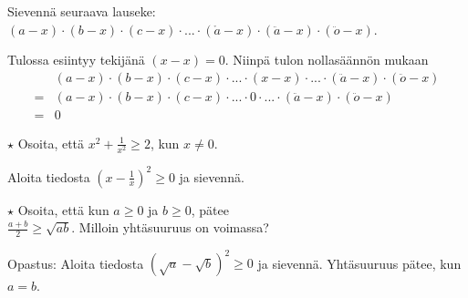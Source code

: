 \begin{tehtavasivu}
\begin{tehtava}
    Sievennä seuraava lauseke: $(a-x)\cdot(b-x)\cdot(c-x)\cdot...\cdot(\mathring{a}-x)\cdot(\ddot{a}-x)\cdot(\ddot{o}-x)$.
    \begin{vastaus}
        Tulossa esiintyy tekijänä $(x-x)=0$. Niinpä tulon nollasäännön mukaan
        \begin{align*}
            &(a-x)\cdot(b-x)\cdot(c-x)\cdot...\cdot(x-x)\cdot...\cdot(\ddot{a}-x)\cdot(\ddot{o}-x) \\
            =&(a-x)\cdot(b-x)\cdot(c-x)\cdot...\cdot 0\cdot...\cdot(\ddot{a}-x)\cdot(\ddot{o}-x) \\
            =&0
        \end{align*}
    \end{vastaus}
\end{tehtava}



\begin{tehtava} %
$\star$ Osoita, että $x^2+\frac{1}{x^2}\geq 2$, kun $x \neq 0$.
    \begin{vastaus}
     Aloita tiedosta $\left(x-\frac{1}{x}\right)^2 \geq 0$ ja sievennä.
    \end{vastaus}
\end{tehtava}

\begin{tehtava} 
$\star$ Osoita, että kun $a \geq 0$ ja $b \geq 0$, pätee \\ $\frac{a+b}{2} \geq \sqrt{ab}$. Milloin yhtäsuuruus on voimassa?
    \begin{vastaus}
     Opastus: Aloita tiedosta $\left(\sqrt{a}-\sqrt{b}\right)^2 \geq 0$ ja sievennä. Yhtäsuuruus pätee, kun $a = b$.
    \end{vastaus}
\end{tehtava}

\end{tehtavasivu}
